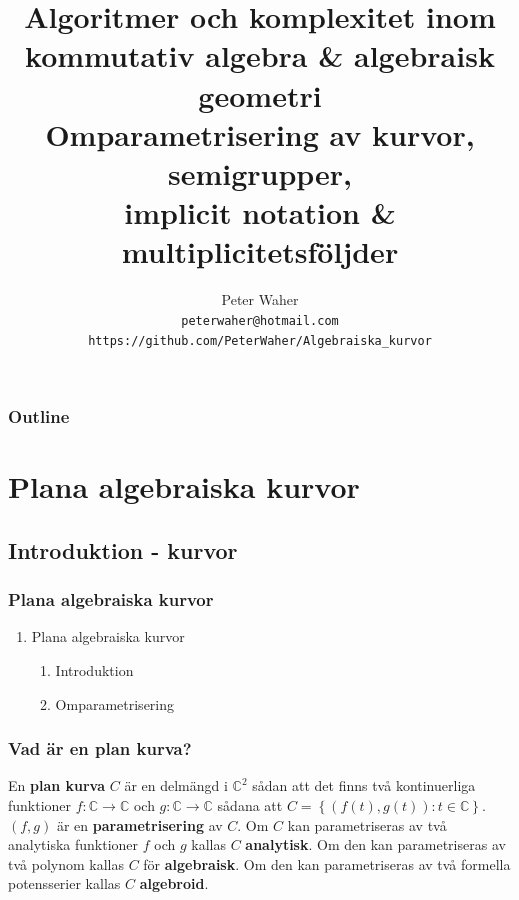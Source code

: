 \documentclass{beamer}
\title[Algoritmer och komplexitet inom algebraisk geometri]{
	Algoritmer och komplexitet inom \\
	kommutativ algebra \& algebraisk geometri \\[20pt]
	\large Omparametrisering av kurvor, semigrupper, \\
	implicit notation \& multiplicitetsföljder}
\author[Peter Waher]{Peter Waher \\[10pt]
	\texttt{peterwaher@hotmail.com}\\
	\texttt{https://github.com/PeterWaher/Algebraiska\_kurvor}}
\begin{document}
\begin{frame}
	\titlepage
\end{frame}

\begin{frame}
	\frametitle{Outline}
	\tableofcontents[pausesections]
\end{frame}





\section{Plana algebraiska kurvor}
\subsection{Introduktion - kurvor}


\begin{frame}
	\frametitle{Plana algebraiska kurvor}
	\begin{enumerate}
		\item<1-> Plana algebraiska kurvor
		\begin{enumerate}
			\item<2-> Introduktion
			\item<3-> Omparametrisering
		\end{enumerate}
	\end{enumerate}
\end{frame}

\begin{frame}
\frametitle{Vad är en plan kurva?}
\begin{Definition}
	En \textbf{plan kurva} $C$ är en delmängd i $\mathbb{C}^2$ sådan att det finns två kontinuerliga funktioner $f : \mathbb{C} \rightarrow \mathbb{C}$ och 
	$g : \mathbb{C} \rightarrow \mathbb{C}$ sådana att $C = \left\{\left(f(t), g(t)\right) : t \in \mathbb{C}\right\}$. $(f, g)$ är en \textbf{parametrisering} av $C$. Om $C$ kan parametriseras av två analytiska funktioner $f$ och $g$ kallas $C$ \textbf{analytisk}. Om den kan parametriseras av två polynom kallas $C$ för \textbf{algebraisk}. Om den kan parametriseras av två formella potensserier kallas $C$ \textbf{algebroid}.
\end{Definition}
\end{frame}
\end{document}
